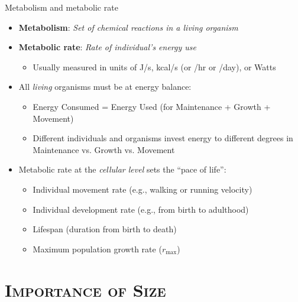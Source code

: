 \begin{frame}{Metabolism and metabolic rate}

  \begin{itemize}[<+->]\setlength{\itemindent}{-1em} \itemsep10pt
    \item {\bf Metabolism}: {\it Set of chemical reactions in a living organism}
    \item {\bf Metabolic rate}: {\it Rate of individual's energy use} 
      \begin{itemize}
        \item Usually measured in units of  J/s, kcal/s (or /hr or /day), or Watts
      \end{itemize}  
    \item All {\it living} organisms must be at energy balance:\\
    \begin{itemize}
      \item Energy Consumed = Energy Used (for Maintenance + Growth + Movement)
      \item Different individuals and organisms invest energy to different degrees in Maintenance vs. Growth vs. Movement 
    \end{itemize}  
    \item Metabolic rate at the {\it cellular level} sets the ``pace of life'':
      \begin{itemize}
        \item Individual movement rate (e.g., walking or running velocity) 
        \item Individual development rate (e.g., from birth to adulthood)
        \item Lifespan (duration from birth to death)
        \item Maximum population growth rate ($r_\text{max}$)
      \end{itemize}    
  \end{itemize}
\end{frame}

\section{\scshape Importance of Size}

